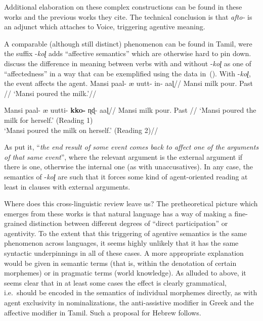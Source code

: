 {Additional elaboration on these complex constructions can be found in these works and the previous works they cite. The technical conclusion is that \emph{afto-} is an adjunct which attaches to Voice, triggering agentive meaning.

A comparable (although still distinct) phenomenon can be found in Tamil, were the suffix -\emph{koɭ} adds ``affective semantics'' which are otherwise hard to pin down. \cite{sundaresanmcfadden17} discuss the difference in meaning between verbs with and without -\emph{koɭ} as one of ``affectedness'' in a way that can be exemplified using the data in~(\nextx). With -\emph{koɭ}, the event affects the agent.
\pex
	\a \begingl
	\gla Mansi paal- æ uutt- in- aaɭ//
	\glb Mansi milk  pour. Past //
	\glft `Mansi poured the milk.'//
	\endgl

	\a 	\begingl
	\gla Mansi paal- æ uutti- \textbf{kko-} ɳɖ- aaɭ//
	\glb Mansi milk  pour.  Past //
	\glft `Mansi poured the milk for herself.' (Reading 1)\\
		`Mansi poured the milk on herself.' (Reading 2)//
	\endgl
\xe

As \citet[165]{sundaresanmcfadden17} put it, ``\emph{the end result of some event comes back to affect one of the arguments of that same event}'', where the relevant argument is the external argument if there is one, otherwise the internal one (as with unaccusatives). In any case, the semantics of -\emph{koɭ} are such that it forces some kind of agent-oriented reading at least in clauses with external arguments.

Where does this cross-linguistic review leave us? The pretheoretical picture which emerges from these works is that natural language has a way of making a fine-grained distinction between different degrees of ``direct participation'' or agentivity. To the extent that this triggering of agentive semantics is the same phenomenon across languages, it seems highly unlikely that it has the same syntactic underpinnings in all of these cases. A more appropriate explanation would be given in semantic terms (that is, within the denotation of certain morphemes) or in pragmatic terms (world knowledge). As alluded to above, it seems clear that in at least some cases the effect is clearly grammatical, i.e.~should be encoded in the semantics of individual morphemes directly, as with agent exclusivity in nominalizations, the anti-assistive modifier in Greek and the affective modifier in Tamil. Such a proposal for Hebrew follows.

}
